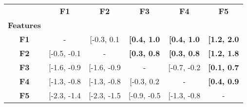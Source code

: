 \setcellgapes{1ex}\makegapedcells\centering\begin{tabular*}{\textwidth}{c|@{\extracolsep{\fill}}ccccc}
\toprule
{} &  \textbf{F1} &  \textbf{F2} &         \textbf{F3} &         \textbf{F4} &         \textbf{F5} \\
\textbf{Features} &              &              &                     &                     &                     \\
\midrule
\textbf{F1      } &  - &  [-0.3, 0.1 &  \textbf{[0.4, 1.0} &  \textbf{[0.4, 1.0} &  \textbf{[1.2, 2.0} \\
\textbf{F2      } &  [-0.5, -0.1 &  - &  \textbf{[0.3, 0.8} &  \textbf{[0.3, 0.8} &  \textbf{[1.2, 1.8} \\
\textbf{F3      } &  [-1.6, -0.9 &  [-1.6, -0.9 &  - &  [-0.7, -0.2 &  \textbf{[0.1, 0.7} \\
\textbf{F4      } &  [-1.3, -0.8 &  [-1.3, -0.8 &  [-0.3, 0.2 &  - &  \textbf{[0.4, 0.9} \\
\textbf{F5      } &  [-2.3, -1.4 &  [-2.3, -1.5 &  [-0.9, -0.5 &  [-1.3, -0.8 &  - \\
\bottomrule
\end{tabular*}